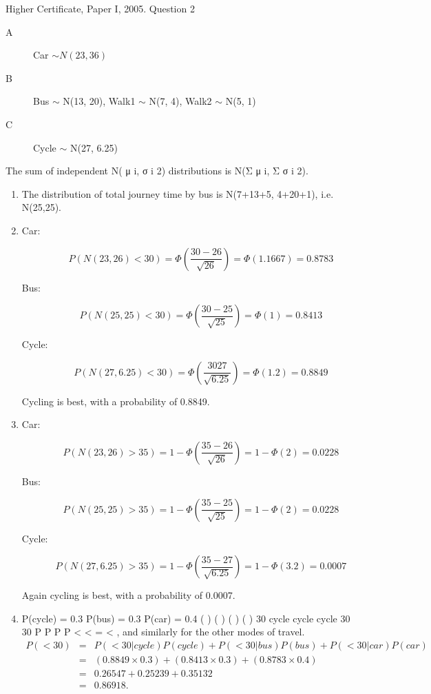\documentclass[a4paper,12pt]{article}
\begin{document}
Higher Certificate, Paper I, 2005. Question 2
\begin{description}
\item[A] Car $\sim N(23, 36)$
\item[B] Bus $\sim$ N(13, 20), Walk1 $\sim$ N(7, 4), Walk2 $\sim$ N(5, 1)
\item[C] Cycle $\sim$ N(27, 6.25)
\end{description}


The sum of independent N( μ
i, σ
i 2) distributions is N(Σ μ
i, Σ σ
i 2).

\begin{enumerate}

\item The distribution of total journey time by bus is N(7+13+5, 4+20+1), i.e. N(25,25).


\item

\begin{description}
\item[Car:]
\[P (N(23,26) < 30)  = \Phi \left( \frac{30- 26}{\sqrt{26}} \right)  = \Phi(1.1667) = 0.8783\]



\item[Bus:]
\[P (N(25,25) < 30)  = \Phi \left( \frac{30- 25}{\sqrt{25}} \right)  = \Phi(1) = 0.8413\]

\item[Cycle: ]
\[P (N(27,6.25) < 30)  = \Phi \left( \frac{30 27}{\sqrt{6.25}} \right)  = \Phi(1.2) = 0.8849\]

\end{description}

Cycling is best, with a probability of 0.8849.

\item 
\begin{description}
\item[Car:]
\[P (N(23,26) >35)  = 1- \Phi \left( \frac{35- 26}{\sqrt{26}} \right)  = 1- \Phi(2) = 0.0228\]

\item[Bus:]
\[P (N(25,25) >35)  = 1- \Phi \left( \frac{35- 25}{\sqrt{25}} \right)  = 1- \Phi(2) = 0.0228\]

\item[Cycle: ]
\[P (N(27,6.25) >35)  = 1- \Phi \left( \frac{35- 27}{\sqrt{6.25}} \right)  = 1- \Phi(3.2) = 0.0007\]


\end{description}
Again cycling is best, with a probability of 0.0007.
\item  P(cycle) = 0.3 P(bus) = 0.3 P(car) = 0.4
( ) ( ) ( )
( )
30 cycle cycle
cycle 30
30
P P
P
P
<
< =
<
, and similarly for the other modes of travel.
\begin{eqnarray*}
P(< 30) &=& P(< 30| cycle)P(cycle) + P(< 30| bus)P(bus) + P(< 30| car)P(car)\\
&=& (0.8849\times 0.3) + (0.8413\times 0.3) + (0.8783\times 0.4)\\
&=& 0.26547 + 0.25239 + 0.35132 \\ 
&=& 0.86918.\\
\end{eqnarray*}


\end{enumerate}
\end{document}
